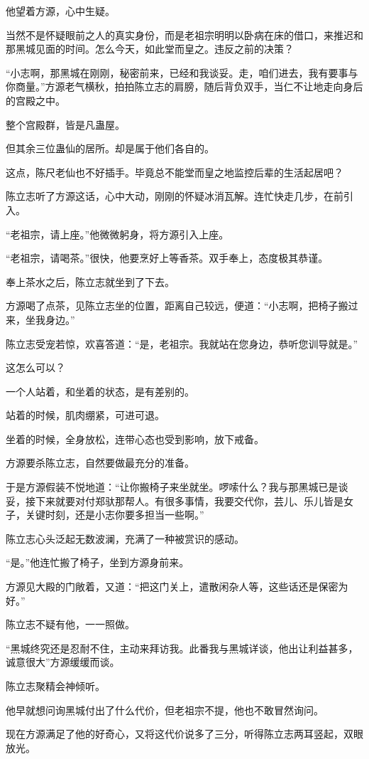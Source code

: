 \begin{this_body}
他望着方源，心中生疑。

当然不是怀疑眼前之人的真实身份，而是老祖宗明明以卧病在床的借口，来推迟和那黑城见面的时间。怎么今天，如此堂而皇之。违反之前的决策？

“小志啊，那黑城在刚刚，秘密前来，已经和我谈妥。走，咱们进去，我有要事与你商量。”方源老气横秋，拍拍陈立志的肩膀，随后背负双手，当仁不让地走向身后的宫殿之中。

整个宫殿群，皆是凡蛊屋。

但其余三位蛊仙的居所。却是属于他们各自的。

这点，陈尺老仙也不好插手。毕竟总不能堂而皇之地监控后辈的生活起居吧？

陈立志听了方源这话，心中大动，刚刚的怀疑冰消瓦解。连忙快走几步，在前引入。

“老祖宗，请上座。”他微微躬身，将方源引入上座。

“老祖宗，请喝茶。”很快，他要烹好上等香茶。双手奉上，态度极其恭谨。

奉上茶水之后，陈立志就坐到了下去。

方源喝了点茶，见陈立志坐的位置，距离自己较远，便道：“小志啊，把椅子搬过来，坐我身边。”

陈立志受宠若惊，欢喜答道：“是，老祖宗。我就站在您身边，恭听您训导就是。”

这怎么可以？

一个人站着，和坐着的状态，是有差别的。

站着的时候，肌肉绷紧，可进可退。

坐着的时候，全身放松，连带心态也受到影响，放下戒备。

方源要杀陈立志，自然要做最充分的准备。

于是方源假装不悦地道：“让你搬椅子来坐就坐。啰嗦什么？我与那黑城已是谈妥，接下来就要对付郑驮那帮人。有很多事情，我要交代你，芸儿、乐儿皆是女子，关键时刻，还是小志你要多担当一些啊。”

陈立志心头泛起无数波澜，充满了一种被赏识的感动。

“是。”他连忙搬了椅子，坐到方源身前来。

方源见大殿的门敞着，又道：“把这门关上，遣散闲杂人等，这些话还是保密为好。”

陈立志不疑有他，一一照做。

“黑城终究还是忍耐不住，主动来拜访我。此番我与黑城详谈，他出让利益甚多，诚意很大”方源缓缓而谈。

陈立志聚精会神倾听。

他早就想问询黑城付出了什么代价，但老祖宗不提，他也不敢冒然询问。

现在方源满足了他的好奇心，又将这代价说多了三分，听得陈立志两耳竖起，双眼放光。


\end{this_body}
